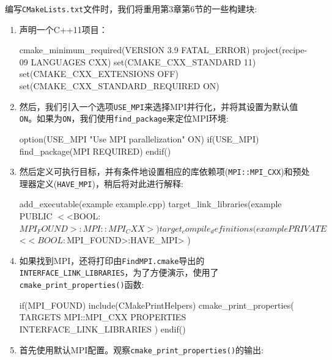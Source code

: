 
编写\texttt{CMakeLists.txt}文件时，我们将重用第3章第6节的一些构建块:

\begin{enumerate}
\item 声明一个C++11项目：

\begin{codebox}[cmake]
cmake_minimum_required(VERSION 3.9 FATAL_ERROR)
project(recipe-09 LANGUAGES CXX)
set(CMAKE_CXX_STANDARD 11)
set(CMAKE_CXX_EXTENSIONS OFF)
set(CMAKE_CXX_STANDARD_REQUIRED ON)
\end{codebox}

\item 然后，我们引入一个选项\texttt{USE\_MPI}来选择MPI并行化，并将其设置为默认值\texttt{ON}。如果为\texttt{ON}，我们使用\texttt{find\_package}来定位MPI环境:

\begin{codebox}[cmake]
option(USE_MPI "Use MPI parallelization" ON)
if(USE_MPI)
    find_package(MPI REQUIRED)
endif()
\end{codebox}

\item 然后定义可执行目标，并有条件地设置相应的库依赖项(\texttt{MPI::MPI\_CXX})和预处理器定义(\texttt{HAVE\_MPI})，稍后将对此进行解释:

\begin{codebox}[cmake]
add_executable(example example.cpp)
target_link_libraries(example
  PUBLIC
    $<$<BOOL:${MPI_FOUND}>:MPI::MPI_CXX>
  )
target_compile_definitions(example
  PRIVATE
    $<$<BOOL:${MPI_FOUND}>:HAVE_MPI>
  ) 
\end{codebox}

\item 如果找到MPI，还将打印由\texttt{FindMPI.cmake}导出的\texttt{INTERFACE\_LINK\_LIBRARIES}，为了方便演示，使用了\texttt{cmake\_print\_properties()}函数:

\begin{codebox}[cmake]
if(MPI_FOUND)
  include(CMakePrintHelpers)
  cmake_print_properties(
    TARGETS MPI::MPI_CXX
    PROPERTIES INTERFACE_LINK_LIBRARIES
    )
endif()
\end{codebox}

\item 首先使用默认MPI配置。观察\texttt{cmake\_print\_properties()}的输出:



\end{enumerate}
